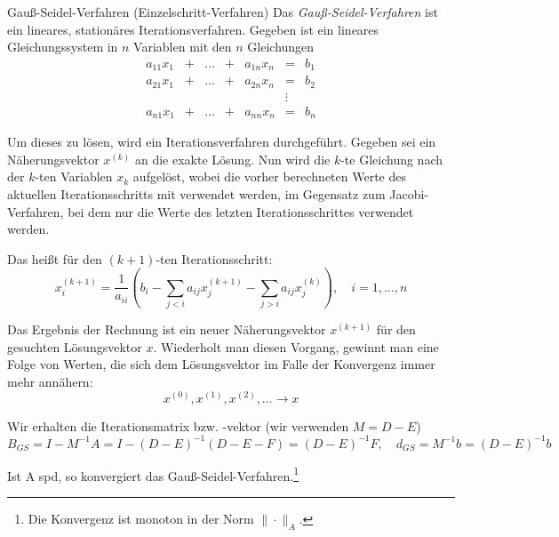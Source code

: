 \begin{defi}{Gauß-Seidel-Verfahren (Einzelschritt-Verfahren)}
    Das \emph{Gauß-Seidel-Verfahren} ist ein lineares, stationäres Iterationsverfahren.
    Gegeben ist ein lineares Gleichungssystem in $n$ Variablen mit den $n$ Gleichungen
    \[
        \begin{matrix}
            a_{11} x_1 & + & \ldots & + & a_{1n} x_n & =      & b_1 \\
            a_{21} x_1 & + & \ldots & + & a_{2n} x_n & =      & b_2 \\
                       &   &        &   &            & \vdots &     \\
            a_{n1} x_1 & + & \ldots & + & a_{nn} x_n & =      & b_n
        \end{matrix}
    \]

    Um dieses zu lösen, wird ein Iterationsverfahren durchgeführt.
    Gegeben sei ein Näherungsvektor $x^{(k)}$ an die exakte Lösung.
    Nun wird die $k$-te Gleichung nach der $k$-ten Variablen $x_k$ aufgelöst, wobei die vorher berechneten Werte des aktuellen Iterationsschritts mit verwendet werden, im Gegensatz zum Jacobi-Verfahren, bei dem nur die Werte des letzten Iterationsschrittes verwendet werden.

    Das heißt für den $(k+1)$-ten Iterationsschritt:
    \[
        x_i^{(k+1)} = \frac{1}{a_{ii}} \left( b_i - \sum_{j < i} a_{ij} x_j^{(k+1)} - \sum_{j > i} a_{ij} x_j^{(k)} \right), \quad i = 1, \ldots, n
    \]

    Das Ergebnis der Rechnung ist ein neuer Näherungsvektor $x^{(k+1)}$ für den gesuchten Lösungsvektor $x$.
    Wiederholt man diesen Vorgang, gewinnt man eine Folge von Werten, die sich dem Lösungsvektor im Falle der Konvergenz immer mehr annähern:
    \[
        x^{(0)}, x^{(1)}, x^{(2)}, \ldots \to x
    \]

    Wir erhalten die Iterationsmatrix bzw. -vektor (wir verwenden $M = D - E$)
    \[
        B_{GS} = I - M^{-1} A = I - (D - E)^{-1} (D - E - F) = (D - E)^{-1} F, \quad d_{GS} = M^{-1} b = (D - E)^{-1} b
    \]

    Ist A spd, so konvergiert das Gauß-Seidel-Verfahren.\footnote{Die Konvergenz ist monoton in der Norm $\| \cdot \|_A$.}
\end{defi}

